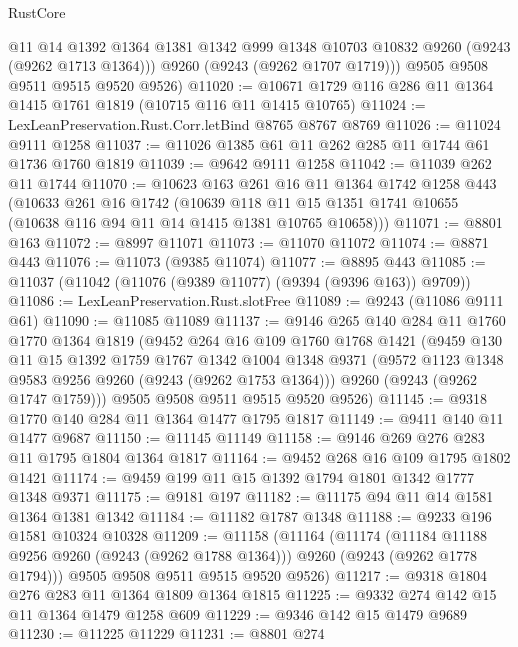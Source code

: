 \begin{lexlean}{RustCore}
\begin{coremodule}
          @11
          @14
          @1392
          @1364
          @1381
          @1342
          @999
          @1348
          @10703
          @10832
          @9260
          (@9243 (@9262 @1713 @1364)))
        @9260
        (@9243 (@9262 @1707 @1719)))
      @9505
      @9508
      @9511
      @9515
      @9520
      @9526)
@11020 := @10671 @1729 @116 @286 @11 @1364 @1415 @1761 @1819 (@10715 @116 @11 @1415 @10765)
@11024 := LexLeanPreservation.Rust.Corr.letBind @8765 @8767 @8769
@11026 := @11024 @9111 @1258
@11037 := @11026 @1385 @61 @11 @262 @285 @11 @1744 @61 @1736 @1760 @1819
@11039 := @9642 @9111 @1258
@11042 := @11039 @262 @11 @1744
@11070 := @10623
    @163
    @261
    @16
    @11
    @1364
    @1742
    @1258
    @443
    (@10633
      @261
      @16
      @1742
      (@10639 @118 @11 @15 @1351 @1741 @10655 (@10638 @116 @94 @11 @14 @1415 @1381 @10765 @10658)))
@11071 := @8801 @163
@11072 := @8997 @11071
@11073 := @11070 @11072
@11074 := @8871 @443
@11076 := @11073 (@9385 @11074)
@11077 := @8895 @443
@11085 := @11037 (@11042 (@11076 (@9389 @11077) (@9394 (@9396 @163)) @9709))
@11086 := LexLeanPreservation.Rust.slotFree
@11089 := @9243 (@11086 @9111 @61)
@11090 := @11085 @11089
@11137 := @9146
    @265
    @140
    @284
    @11
    @1760
    @1770
    @1364
    @1819
    (@9452
      @264
      @16
      @109
      @1760
      @1768
      @1421
      (@9459
        @130
        @11
        @15
        @1392
        @1759
        @1767
        @1342
        @1004
        @1348
        @9371
        (@9572 @1123 @1348 @9583 @9256 @9260 (@9243 (@9262 @1753 @1364)))
        @9260
        (@9243 (@9262 @1747 @1759)))
      @9505
      @9508
      @9511
      @9515
      @9520
      @9526)
@11145 := @9318 @1770 @140 @284 @11 @1364 @1477 @1795 @1817
@11149 := @9411 @140 @11 @1477 @9687
@11150 := @11145 @11149
@11158 := @9146 @269 @276 @283 @11 @1795 @1804 @1364 @1817
@11164 := @9452 @268 @16 @109 @1795 @1802 @1421
@11174 := @9459 @199 @11 @15 @1392 @1794 @1801 @1342 @1777 @1348 @9371
@11175 := @9181 @197
@11182 := @11175 @94 @11 @14 @1581 @1364 @1381 @1342
@11184 := @11182 @1787 @1348
@11188 := @9233 @196 @1581 @10324 @10328
@11209 := @11158
    (@11164
      (@11174
        (@11184 @11188 @9256 @9260 (@9243 (@9262 @1788 @1364)))
        @9260
        (@9243 (@9262 @1778 @1794)))
      @9505
      @9508
      @9511
      @9515
      @9520
      @9526)
@11217 := @9318 @1804 @276 @283 @11 @1364 @1809 @1364 @1815
@11225 := @9332 @274 @142 @15 @11 @1364 @1479 @1258 @609
@11229 := @9346 @142 @15 @1479 @9689
@11230 := @11225 @11229
@11231 := @8801 @274

\end{coremodule}
\end{lexlean}
